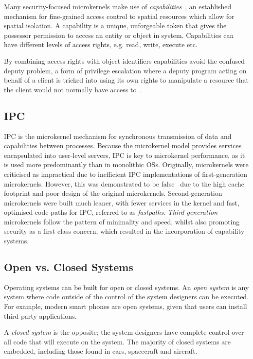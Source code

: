 Many security-focused microkernels make use of \emph{capabilities}~\citep{Dennis_VanHorn_66}, an
established mechanism for fine-grained access control to spatial resources which allow for spatial
    isolation. A capability is a unique, unforgeable token that gives the possessor permission to access
an entity or object in system. Capabilities can have different levels of access rights, e.g. read,
write, execute etc. 

By combining access rights with object identifiers capabilities avoid the
confused deputy problem, a form of privilege escalation where a deputy program
acting on behalf of a client is  tricked into using
its own rights to manipulate a resource that the client would not normally have access
to~\citep{Hardy_88}. 

\subsection{IPC}
\label{s:background-ipc}

\gls{IPC} is the microkernel mechanism for synchronous transmission of data and capabilities between
processes. Because the microkernel model provides services encapsulated into user-level servers,
\gls{IPC} is key to microkernel performance, as it is used more predominantly than in monolithic
\glspl{OS}. Originally, microkernels were criticised as impractical due to inefficient IPC
implementations of first-generation microkernels. However, this was demonstrated to be
false~\citep{Hartig_HLSW_97} due to the high cache footprint and poor design of the original
microkernels. Second-generation microkernels were built much leaner, with fewer services in the
kernel and fast, optimised code paths for IPC, referred to as \emph{fastpaths}. 
\emph{Third-generation} microkernels follow the pattern of minimality and speed, whilst also
promoting security as a first-class concern, which resulted in the incorporation of capability
systems. 

\subsection{Open vs. Closed Systems}

Operating systems can be built for open or closed systems.  An \emph{open system} is any system
where code outside of the control of the system designers can be executed. For example, modern
smart phones are open systems, given that users can install third-party applications.

A \emph{closed system} is the opposite; the system designers have complete control over all code
that will execute on the system.  The majority of closed systems are embedded, including those found
in cars, spacecraft and aircraft.

